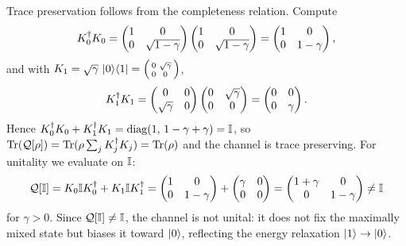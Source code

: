 \begin{solution}
Trace preservation follows from the completeness relation. Compute
\[
  K_0^{\dagger} K_0=\begin{pmatrix}1&0\\0&\sqrt{1-\gamma}\end{pmatrix}
             \begin{pmatrix}1&0\\0&\sqrt{1-\gamma}\end{pmatrix}
            =\begin{pmatrix}1&0\\0&1-\gamma\end{pmatrix},
\]
and with $K_1=\sqrt{\gamma}\,\ket{0}\!\bra{1}=\begin{psmallmatrix}0&\sqrt{\gamma}\\0&0\end{psmallmatrix}$,
\[
  K_1^{\dagger} K_1=\begin{pmatrix}0&0\\\sqrt{\gamma}&0\end{pmatrix}
             \begin{pmatrix}0&\sqrt{\gamma}\\0&0\end{pmatrix}
            =\begin{pmatrix}0&0\\0&\gamma\end{pmatrix}.
\]
Hence $K_0^{\dagger} K_0+K_1^{\dagger} K_1=\operatorname{diag}(1,\,1-\gamma+\gamma)=\mathbb{I}$, so
$\operatorname{Tr}(\mathcal{Q}[\rho])=\operatorname{Tr}(\rho\sum_j K_j^{\dagger} K_j)=\operatorname{Tr}(\rho)$ and the channel is
trace preserving. For unitality we evaluate on $\mathbb{I}$:
\[
  \mathcal{Q}[\mathbb{I}]=K_0\mathbb{I} K_0^{\dagger}+K_1\mathbb{I} K_1^{\dagger}
   =\begin{pmatrix}1&0\\0&1-\gamma\end{pmatrix}
   +\begin{pmatrix}\gamma&0\\0&0\end{pmatrix}
   =\begin{pmatrix}1+\gamma&0\\0&1-\gamma\end{pmatrix}\ne\mathbb{I}
\]
for $\gamma>0$. Since $\mathcal{Q}[\mathbb{I}]\ne\mathbb{I}$, the channel is not unital: it does
not fix the maximally mixed state but biases it toward $\ket{0}$, reflecting the
energy relaxation $\ket{1}\to\ket{0}$.
\end{solution}

